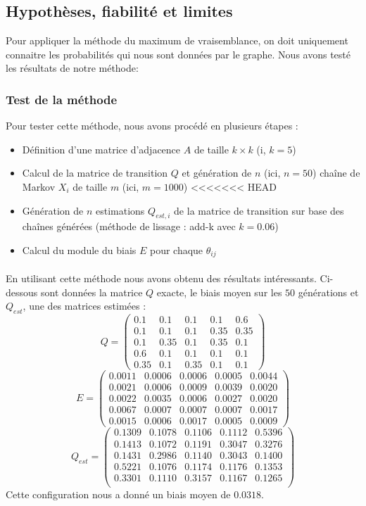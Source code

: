 \documentclass[a4paper,titlepage]{report}
\begin{document}
\subsection{Hypothèses, fiabilité et limites}
Pour appliquer la méthode du maximum de vraisemblance, on doit uniquement connaitre les probabilités qui nous sont données par le graphe. Nous avons testé les résultats de notre méthode: 

\subsubsection{Test de la méthode}
Pour tester cette méthode, nous avons procédé en plusieurs étapes : 
\begin{itemize}
	\item Définition d'une matrice d'adjacence $A$ de taille $k \times k$ (i, $k = 5$)
	\item Calcul de la matrice de transition $Q$ et génération de $n$ (ici, $n = 50$) chaîne de Markov $X_i$ de taille $m$ (ici, $m = 1000$)
<<<<<<< HEAD
	\item Génération de $n$ estimations $Q_{est,i}$ de la matrice de transition sur base des chaînes générées (méthode de lissage : add-k avec $k = 0.06$)
	\item Calcul du module du biais $E$ pour chaque $\theta_{ij}$ 
\end{itemize}
\paragraph{}
En utilisant cette méthode nous avons obtenu des résultats intéressants. Ci-dessous sont données la matrice $Q$ exacte, le biais moyen sur les $50$ générations et $Q_{est}$, une des matrices estimées :
\[
Q = 
\begin{pmatrix}
 0.1 & 0.1 & 0.1 & 0.1 & 0.6\\
 0.1 & 0.1 & 0.1 & 0.35 & 0.35\\
 0.1 & 0.35 & 0.1 & 0.35 & 0.1\\
 0.6 & 0.1 & 0.1 & 0.1 & 0.1\\
 0.35 & 0.1 & 0.35 & 0.1 & 0.1 
\end{pmatrix}
\]
\[
E = 
\begin{pmatrix}
0.0011 & 0.0006 & 0.0006 & 0.0005 & 0.0044\\
0.0021 & 0.0006 & 0.0009 & 0.0039 & 0.0020\\
0.0022 & 0.0035 & 0.0006 & 0.0027 & 0.0020\\
0.0067 & 0.0007 & 0.0007 & 0.0007 & 0.0017\\
0.0015 & 0.0006 & 0.0017 & 0.0005 & 0.0009 
\end{pmatrix}
\]
\[
Q_{est} = 
\begin{pmatrix}
0.1309 & 0.1078 & 0.1106 & 0.1112 & 0.5396\\
0.1413 & 0.1072 & 0.1191 & 0.3047 & 0.3276\\
0.1431 & 0.2986 & 0.1140 & 0.3043 & 0.1400\\
0.5221 & 0.1076 & 0.1174 & 0.1176 & 0.1353\\
0.3301 & 0.1110 & 0.3157 & 0.1167 & 0.1265\\
\end{pmatrix}
\]
Cette configuration nous a donné un biais moyen de $0.0318$.
\end{document}
